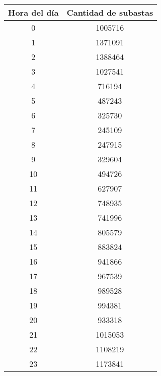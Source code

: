 \begin{center}
	\begin{tabular}{ |c|c| }
    	\hline
        Hora del día & Cantidad de subastas \\
        \hline\hline
		0 & 1005716\\
        \hline
       	1 & 1371091 \\
        \hline
        2 & 1388464 \\
        \hline
        3 & 1027541 \\
        \hline
        4 & 716194\\
        \hline
       	5 & 487243 \\
        \hline
        6 & 325730 \\
        \hline
        7 & 245109 \\
        \hline
        8 & 247915\\
        \hline
        9 & 329604\\
        \hline
       	10 & 494726 \\
        \hline
        11 & 627907 \\
        \hline
        12 & 748935 \\
        \hline
        13 & 741996\\
        \hline
       	14 & 805579 \\
        \hline
        15 & 883824 \\
        \hline
        16 & 941866 \\
        \hline
        17 & 967539\\
        \hline
        18 & 989528 \\
        \hline
        19 & 994381\\
        \hline
       	20 & 933318 \\
        \hline
        21 & 1015053 \\
        \hline
        22 & 1108219 \\
        \hline
        23 & 1173841\\
        \hline
	\end{tabular}
 	

\end{center}
